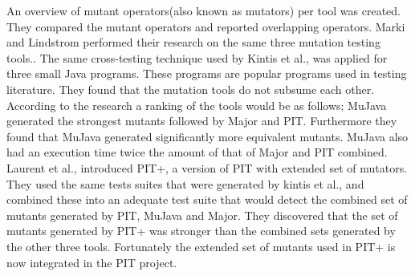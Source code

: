 \documentclass[../main]{subfiles}
\begin{document}
An overview of mutant operators(also known as mutators) per tool was created. 
They compared the mutant operators and reported overlapping operators.
\newline
Marki and Lindstrom performed their research on the same three mutation testing tools.\cite{Marki2017MutationJava}. 
The same cross-testing technique used by Kintis et al., was applied for three small Java programs. 
These programs are popular programs used in testing literature.
They found that the mutation tools do not subsume each other. 
According to the research a ranking of the tools would be as follows; MuJava generated the strongest mutants followed by Major and PIT.
Furthermore they found that MuJava generated significantly more equivalent mutants\cite{Marki2017MutationJava}.
MuJava also had an execution time twice the amount of that of Major and PIT combined.
\newline
Laurent et al., introduced PIT+, a version of PIT with extended set of mutators\cite{Laurent2017AssessingPIT}.
They used the same tests suites that were generated by kintis et al., and combined these into an adequate test suite that would detect the combined set of mutants generated by PIT, MuJava and Major. 
They discovered that the set of mutants generated by PIT+ was stronger than the combined sets generated by the other three tools.
Fortunately the extended set of mutants used in PIT+ is now integrated in the PIT project\cite{pit+}.
\end{document}
